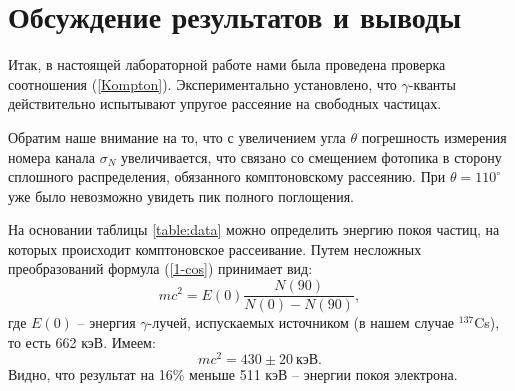 \documentclass[a4paper, 12pt]{article}
\begin{document}
\section*{Обсуждение результатов и выводы}
	Итак, в настоящей лабораторной работе нами была проведена проверка соотношения (\ref{Kompton}). Экспериментально установлено, что $\gamma$-кванты действительно испытывают упругое рассеяние на свободных частицах. 
	
	Обратим наше внимание на то, что с увеличением угла $\theta$ погрешность измерения номера канала $\sigma_N$ увеличивается, что связано со смещением фотопика в сторону сплошного распределения, обязанного комптоновскому рассеянию. При $\theta = 110^\circ$ уже было невозможно увидеть пик полного поглощения.
	
	На основании таблицы \ref{table:data} можно определить энергию покоя частиц, на которых происходит комптоновское рассеивание. Путем несложных преобразований формула (\ref{1-cos}) принимает вид:
	\begin{equation*}
		mc^2 = E(0) \frac{N(90)}{N(0)-N(90)},
	\end{equation*}
	где $E(0)$ -- энергия $\gamma$-лучей, испускаемых источником (в нашем случае $^{137}$Cs), то есть 662 кэВ. Имеем:
	\[
	\boxed{mc^2 = 430 \pm 20 \ \text{кэВ}}.
	\]
	Видно, что результат на 16\% меньше 511 кэВ -- энергии покоя электрона. 
\end{document}
